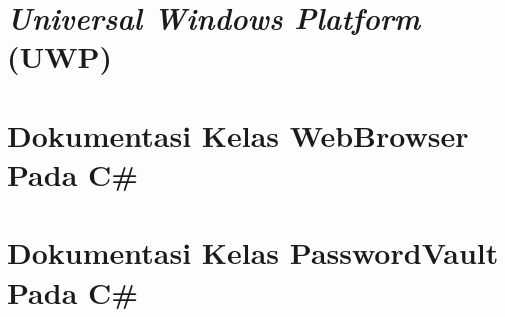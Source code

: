 \section{\textit{Universal Windows Platform} (UWP)}
\label{sec:uwp}



\section{Dokumentasi Kelas WebBrowser Pada C\#}
\label{sec:webbrowser}



\section{Dokumentasi Kelas PasswordVault Pada C\#}
\label{sec:passwordvault}



